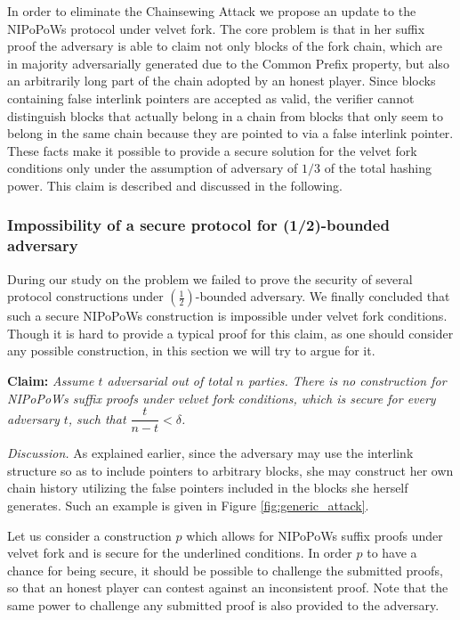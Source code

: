 In order to eliminate the Chainsewing Attack we propose an update to the NIPoPoWs protocol under velvet fork. The core problem is that in her suffix proof the adversary is able to claim not only blocks of the fork chain,  which are in majority adversarially generated due to the Common Prefix property, but also an arbitrarily long part of the chain adopted by an honest player. Since blocks containing false interlink pointers are accepted as valid, the verifier cannot distinguish blocks that actually belong in a chain from blocks that only seem to belong in the same chain because they are pointed to via a false interlink pointer. \\

These facts make it possible to provide a secure solution for the velvet fork conditions only under the assumption of adversary of $1/3$ of the total hashing power. This claim is described and discussed in the following.

\subsubsection*{Impossibility of a secure protocol for (1/2)-bounded adversary}
During our study on the problem we failed to prove the security of several protocol constructions under $(\frac{1}{2})$-bounded adversary. We finally concluded that such a secure NIPoPoWs construction is impossible under velvet fork conditions. Though it is hard to provide a typical proof for this claim, as one should consider any possible construction, in this section we will try to argue for it. 

\textbf{Claim:} \textit{Assume $t$ adversarial out of total $n$ parties. There is no construction for NIPoPoWs suffix proofs under velvet fork conditions, which is secure for every adversary $t$, such that $\dfrac{t}{n-t} < \delta$.}

\textit{Discussion.} As explained earlier, since the adversary may use the interlink structure so as to include pointers to arbitrary blocks,  she may construct her own chain history utilizing the false pointers included in the blocks she herself generates. Such an example is given in Figure \ref{fig:generic_attack}.

Let us consider a construction $p$ which allows for NIPoPoWs suffix proofs under velvet fork and is secure for the underlined conditions. In order $p$ to have a chance for being secure, it should be possible to challenge the submitted proofs, so that an honest player can contest against an inconsistent proof. Note that the same power to challenge any submitted proof is also provided to the adversary.



